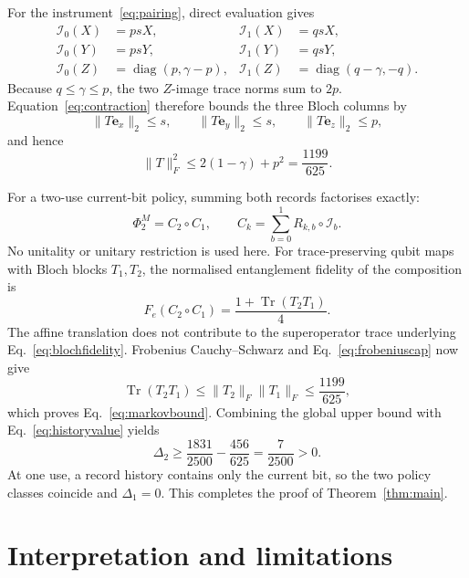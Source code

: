 \documentclass[11pt]{article}
\newcommand{\cI}{\mathcal I}
\newcommand{\Tr}{\operatorname{Tr}}
\newcommand{\diag}{\operatorname{diag}}
\begin{document}
For the instrument~\eqref{eq:pairing}, direct evaluation gives
\begin{align}
 \cI_0(X)&=psX,& \cI_1(X)&=qsX,\nonumber\\
 \cI_0(Y)&=psY,& \cI_1(Y)&=qsY,\label{eq:pauliimages}\\
 \cI_0(Z)&=\diag(p,\gamma-p),&
 \cI_1(Z)&=\diag(q-\gamma,-q).\nonumber
\end{align}
Because $q\le\gamma\le p$, the two $Z$-image trace norms sum to $2p$.
Equation~\eqref{eq:contraction} therefore bounds the three Bloch columns by
\begin{equation}
 \|T\bm e_x\|_2\le s,\qquad
 \|T\bm e_y\|_2\le s,\qquad
 \|T\bm e_z\|_2\le p,
\end{equation}
and hence
\begin{equation}
 \|T\|_F^2\le 2(1-\gamma)+p^2=\frac{1199}{625}.
 \label{eq:frobeniuscap}
\end{equation}

For a two-use current-bit policy, summing both records factorises exactly:
\begin{equation}
 \Phi_2^M=C_2\circ C_1,\qquad
 C_k=\sum_{b=0}^{1}R_{k,b}\circ\cI_b.
 \label{eq:factorisation}
\end{equation}
No unitality or unitary restriction is used here.  For trace-preserving qubit maps with
Bloch blocks $T_1,T_2$, the normalised entanglement fidelity of the composition is
\begin{equation}
 F_e(C_2\circ C_1)=\frac{1+\Tr(T_2T_1)}4.
 \label{eq:blochfidelity}
\end{equation}
The affine translation does not contribute to the superoperator trace underlying
Eq.~\eqref{eq:blochfidelity}.  Frobenius Cauchy--Schwarz and
Eq.~\eqref{eq:frobeniuscap} now give
\begin{equation}
 \Tr(T_2T_1)\le\|T_2\|_F\|T_1\|_F\le\frac{1199}{625},
\end{equation}
which proves Eq.~\eqref{eq:markovbound}.  Combining the global upper bound with
Eq.~\eqref{eq:historyvalue} yields
\begin{equation}
 \Delta_2\ge\frac{1831}{2500}-\frac{456}{625}
 =\frac7{2500}>0.
\end{equation}
At one use, a record history contains only the current bit, so the two policy classes
coincide and $\Delta_1=0$.  This completes the proof of Theorem~\ref{thm:main}.

\section{Interpretation and limitations}
\end{document}
